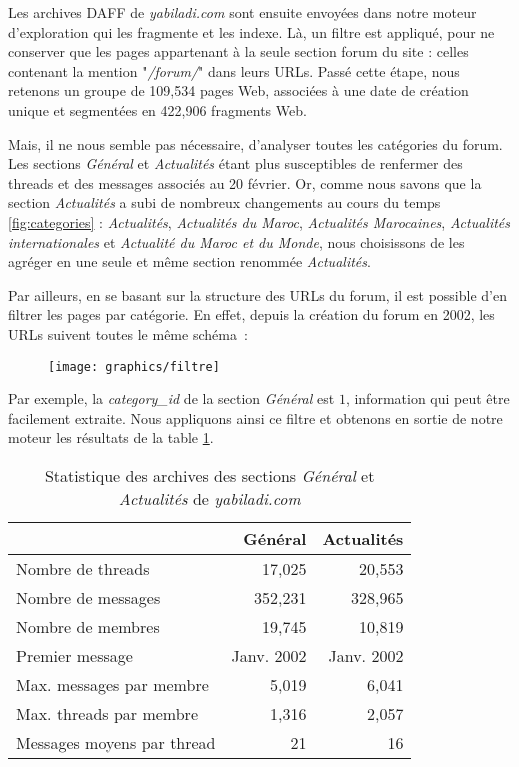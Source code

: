 \documentclass[symmetric,justified,marginals=raggedouter]{tufte-book}
\begin{document}
Les archives DAFF de \textit{yabiladi.com} sont ensuite envoyées dans notre moteur d'exploration qui les fragmente et les indexe. Là, un filtre est appliqué, pour ne conserver que les pages appartenant à la seule section forum du site : celles contenant la mention "\textit{/forum/}" dans leurs URLs. Passé cette étape, nous retenons un groupe de 109,534 pages Web, associées à une date de création unique et segmentées en 422,906 fragments Web.

Mais, il ne nous semble pas nécessaire, d'analyser toutes les catégories du forum. Les sections \textit{Général} et \textit{Actualités} étant plus susceptibles de renfermer des threads et des messages associés au 20 février. Or, comme nous savons que la section \textit{Actualités} a subi de nombreux changements au cours du temps \ref{fig:categories} : \textit{Actualités}, \textit{Actualités du Maroc}, \textit{Actualités Marocaines},  \textit{Actualités internationales} et \textit{Actualité du Maroc et du Monde}, nous choisissons de les agréger en une seule et même section renommée \textit{Actualités}. 

Par ailleurs, en se basant sur la structure des URLs du forum, il est possible d'en filtrer les pages par catégorie. En effet, depuis la création du forum en 2002, les URLs suivent toutes le même schéma~:

\begin{figure}
  \texttt{[image: graphics/filtre]}
\end{figure}  

\noindent Par exemple, la \textit{category\_id} de la section \textit{Général} est $1$, information qui peut être facilement extraite. Nous appliquons ainsi ce filtre et obtenons en sortie de notre moteur les résultats de la table \ref{tab:forum}.

\newpage

\begin{table}
  \label{tab:forum}
  \begin{tabular}{lrr}
    \toprule
    & Général & Actualités\\
    \midrule    
    Nombre de threads&17,025&20,553\\
    Nombre de messages&352,231&328,965\\
    Nombre de membres&19,745&10,819\\
	Premier message&Janv. 2002&Janv. 2002\\    	
	Max. messages par membre&5,019&6,041\\	
	Max. threads par membre&1,316&2,057\\
	Messages moyens par thread&21&16\\    
  \bottomrule
  \end{tabular}
  \bigskip
  \caption{Statistique des archives des sections \textit{Général} et \textit{Actualités} de \textit{yabiladi.com}}
\end{table} 
\end{document}
